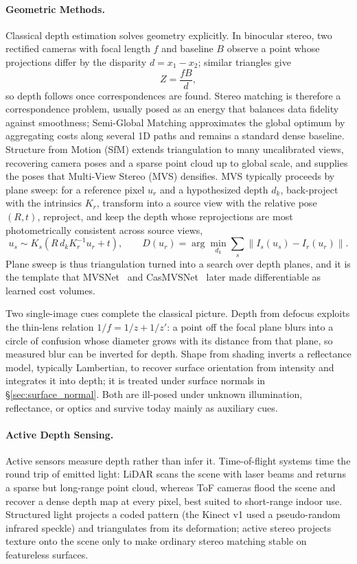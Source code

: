 \paragraph{Geometric Methods.}
Classical depth estimation solves geometry explicitly. In binocular stereo, two rectified cameras with focal length $f$ and baseline $B$ observe a point whose projections differ by the disparity $d = x_1 - x_2$; similar triangles give
\begin{equation}
Z = \frac{fB}{d},
\end{equation}
so depth follows once correspondences are found. Stereo matching is therefore a correspondence problem, usually posed as an energy that balances data fidelity against smoothness; Semi-Global Matching approximates the global optimum by aggregating costs along several 1D paths and remains a standard dense baseline. Structure from Motion (SfM) extends triangulation to many uncalibrated views, recovering camera poses and a sparse point cloud up to global scale, and supplies the poses that Multi-View Stereo (MVS) densifies. MVS typically proceeds by plane sweep: for a reference pixel $u_r$ and a hypothesized depth $d_k$, back-project with the intrinsics $K_r$, transform into a source view with the relative pose $(R, t)$, reproject, and keep the depth whose reprojections are most photometrically consistent across source views,
\begin{equation}
u_s \sim K_s\left(R\, d_k K_r^{-1} u_r + t\right), \qquad
D(u_r) = \arg\min_{d_k} \sum_s \left\| I_s(u_s) - I_r(u_r) \right\|.
\end{equation}
Plane sweep is thus triangulation turned into a search over depth planes, and it is the template that MVSNet~\cite{yao2018mvsnet} and CasMVSNet~\cite{gu2020cascade} later made differentiable as learned cost volumes.

Two single-image cues complete the classical picture. Depth from defocus exploits the thin-lens relation $1/f = 1/z + 1/z'$: a point off the focal plane blurs into a circle of confusion whose diameter grows with its distance from that plane, so measured blur can be inverted for depth. Shape from shading inverts a reflectance model, typically Lambertian, to recover surface orientation from intensity and integrates it into depth; it is treated under surface normals in \S\ref{sec:surface_normal}. Both are ill-posed under unknown illumination, reflectance, or optics and survive today mainly as auxiliary cues.

\paragraph{Active Depth Sensing.}
Active sensors measure depth rather than infer it. Time-of-flight systems time the round trip of emitted light: LiDAR scans the scene with laser beams and returns a sparse but long-range point cloud, whereas ToF cameras flood the scene and recover a dense depth map at every pixel, best suited to short-range indoor use. Structured light projects a coded pattern (the Kinect v1 used a pseudo-random infrared speckle) and triangulates from its deformation; active stereo projects texture onto the scene only to make ordinary stereo matching stable on featureless surfaces.


